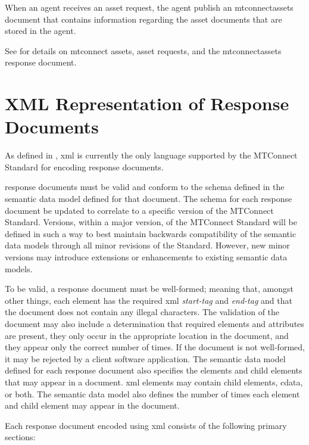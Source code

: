 When an \gls{agent} receives an \gls{asset request}, the \gls{agent} \MUST publish an \gls{mtconnectassets} document that contains information regarding the \glspl{asset document} that are stored in the \gls{agent}.

See  for details on \glspl{mtconnect asset}, \glspl{asset request}, and the \gls{mtconnectassets response document}.

\section{XML Representation of Response Documents}
\label{sec:XML Representation of Response Documents}

As defined in , \gls{xml} is currently the only language supported by the MTConnect Standard for encoding \glspl{response document}.

\glspl{response document} must be valid and conform to the \gls{schema} defined in the \gls{semantic data model} defined for that document.  The \gls{schema} for each \gls{response document} \MUST be updated to correlate to a specific version of the MTConnect Standard.  Versions, within a \gls{major} version, of the MTConnect Standard will be defined in such a way to best maintain backwards compatibility of the \glspl{semantic data model} through all \gls{minor} revisions of the Standard.  However, new \gls{minor} versions may introduce extensions or enhancements to existing \glspl{semantic data model}.

To be valid, a \gls{response document} must be well-formed; meaning that, amongst other things, each element has the required \gls{xml} \textit{start-tag} and \textit{end-tag} and that the document does not contain any illegal characters.  The validation of the document may also include a determination that required elements and attributes are present, they only occur in the appropriate location in the document, and they appear only the correct number of times.  If the document is not well-formed, it may be rejected by a client software application.  The \gls{semantic data model} defined for each \gls{response document} also specifies the elements and \glspl{child element} that may appear in a document.  \gls{xml} elements may contain \glspl{child element}, \gls{cdata}, or both.  The \gls{semantic data model} also defines the number of times each element and \gls{child element} may appear in the document.

Each \gls{response document} encoded using \gls{xml} consists of the following primary sections:

